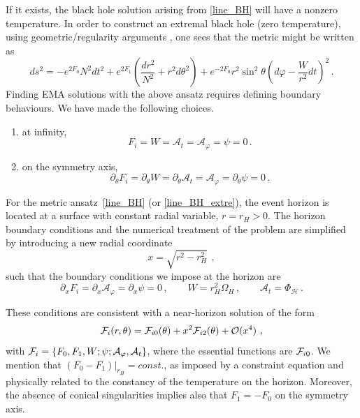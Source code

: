 \documentclass[11pt]{article}
\numberwithin{equation}{section} %
\begin{document}
If it exists, the black hole solution arising from \eqref{line_BH} will have a nonzero temperature. In order to construct an extremal black hole (zero temperature), using geometric/regularity arguments \cite{CarneirodaCunha:2010cyg}, one sees that the metric might be written as
%
\begin{equation}\label{line_BH_extre}
d s^2=-e^{2 F_0} N^2 d t^2+e^{2 F_1}\left(\frac{d r^2}{N^2}+r^2 d \theta^2\right)+e^{-2 F_0} r^2 \sin ^2 \theta\left(d \varphi-\dfrac{W}{r^2} d t\right)^2\,.
\end{equation}
%
\medskip
Finding EMA solutions with the above ansatz requires defining boundary behaviours. We have made the following choices.
	\begin{enumerate}		
		\item at infinity,
		\begin{equation}
			F_i=W=\mathcal{A}_t=\mathcal{A}_\varphi= \psi=0 \, .
		\end{equation}

		\item on the symmetry axis,
		\begin{equation}
			\partial_\theta F_i=\partial_\theta W=\partial_\theta \mathcal{A}_t=\mathcal{A}_\varphi=\partial_\theta\psi=0\,.
		\end{equation}

	\end{enumerate}

 For the metric ansatz~\eqref{line_BH} (or \eqref{line_BH_extre}), the event horizon is located at a surface with constant radial variable, $r=r_H>0$.
The horizon boundary conditions and the numerical treatment of the problem are simplified by introducing a new radial coordinate
\begin{equation}
x=\sqrt{r^2-r_H^2} ~\, ,
\label{x}
\end{equation}
such that the boundary conditions we impose at the horizon are
		\begin{equation}
			\partial_x F_i=\partial_x \mathcal{A}_\varphi=\partial_x\psi=0 \, ,\qquad   W=r_H^2 \Omega_H\,,\qquad \mathcal{A}_t=\Phi_{\mathcal{H}}\, .
		\end{equation}

These conditions are consistent with a near-horizon solution of the form
\begin{eqnarray}
\label{rh}
{\cal F}_i(r,\theta)= {\cal F}_{i0}(\theta)+x^2 {\cal F}_{i2}(\theta)+\mathcal{O}(x^4)\ ,
\end{eqnarray}  
with ${\cal F}_i =\{F_0, F_1,  W; \psi;\mathcal{A}_\varphi,\mathcal{A}_t\}$,
where the essential functions are
${\cal F}_{i0}$. We mention that $(F_0 -F_1)\big |_{r_H}=const.$,
as imposed by a constraint equation and physically related to the constancy of the temperature on the horizon. Moreover, the absence of conical singularities implies also that $
F_1=-F_0 
$
on the symmetry axis.
\end{document}
